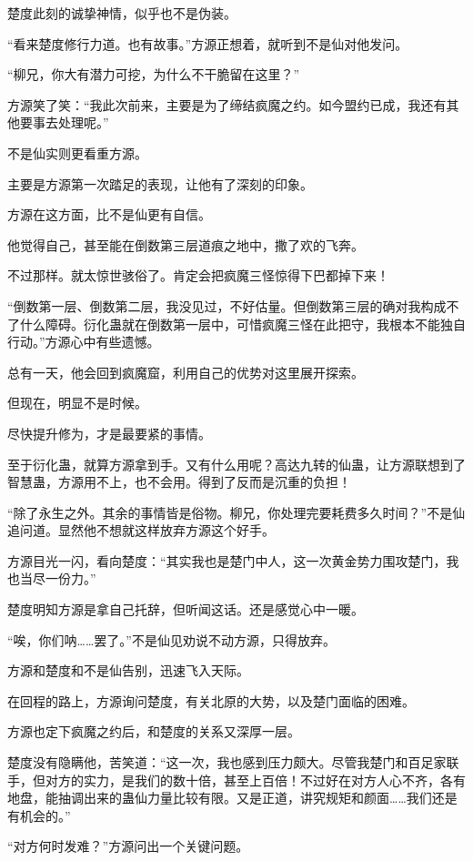 \begin{this_body}
楚度此刻的诚挚神情，似乎也不是伪装。

“看来楚度修行力道。也有故事。”方源正想着，就听到不是仙对他发问。

“柳兄，你大有潜力可挖，为什么不干脆留在这里？”

方源笑了笑：“我此次前来，主要是为了缔结疯魔之约。如今盟约已成，我还有其他要事去处理呢。”

不是仙实则更看重方源。

主要是方源第一次踏足的表现，让他有了深刻的印象。

方源在这方面，比不是仙更有自信。

他觉得自己，甚至能在倒数第三层道痕之地中，撒了欢的飞奔。

不过那样。就太惊世骇俗了。肯定会把疯魔三怪惊得下巴都掉下来！

“倒数第一层、倒数第二层，我没见过，不好估量。但倒数第三层的确对我构成不了什么障碍。衍化蛊就在倒数第一层中，可惜疯魔三怪在此把守，我根本不能独自行动。”方源心中有些遗憾。

总有一天，他会回到疯魔窟，利用自己的优势对这里展开探索。

但现在，明显不是时候。

尽快提升修为，才是最要紧的事情。

至于衍化蛊，就算方源拿到手。又有什么用呢？高达九转的仙蛊，让方源联想到了智慧蛊，方源用不上，也不会用。得到了反而是沉重的负担！

“除了永生之外。其余的事情皆是俗物。柳兄，你处理完要耗费多久时间？”不是仙追问道。显然他不想就这样放弃方源这个好手。

方源目光一闪，看向楚度：“其实我也是楚门中人，这一次黄金势力围攻楚门，我也当尽一份力。”

楚度明知方源是拿自己托辞，但听闻这话。还是感觉心中一暖。

“唉，你们呐……罢了。”不是仙见劝说不动方源，只得放弃。

方源和楚度和不是仙告别，迅速飞入天际。

在回程的路上，方源询问楚度，有关北原的大势，以及楚门面临的困难。

方源也定下疯魔之约后，和楚度的关系又深厚一层。

楚度没有隐瞒他，苦笑道：“这一次，我也感到压力颇大。尽管我楚门和百足家联手，但对方的实力，是我们的数十倍，甚至上百倍！不过好在对方人心不齐，各有地盘，能抽调出来的蛊仙力量比较有限。又是正道，讲究规矩和颜面……我们还是有机会的。”

“对方何时发难？”方源问出一个关键问题。


\end{this_body}
